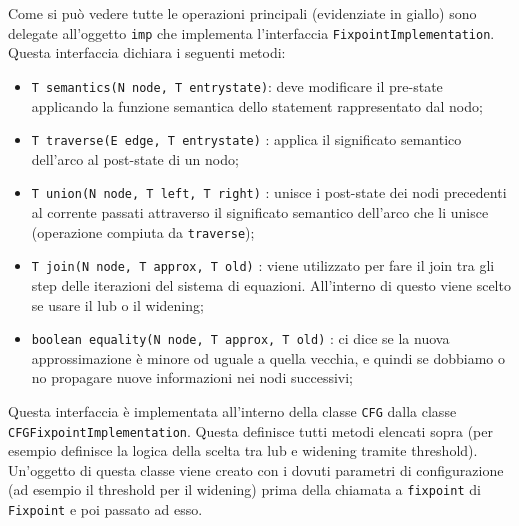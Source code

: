Come si può vedere tutte le operazioni principali (evidenziate in giallo) sono delegate all'oggetto \texttt{imp} che implementa l'interfaccia \texttt{FixpointImplementation}. Questa interfaccia dichiara i seguenti metodi:
\begin{itemize}
\itemsep0pt
    \item \texttt{T semantics(N node, T entrystate)}: deve modificare il pre-state applicando la funzione semantica dello statement rappresentato dal nodo;
	\item \texttt{T traverse(E edge, T entrystate)} : applica il significato semantico dell'arco al post-state di un nodo;
	\item \texttt{T union(N node, T left, T right)} : unisce i post-state dei nodi precedenti al corrente passati attraverso il significato semantico dell'arco che li unisce (operazione compiuta da \texttt{traverse});
	\item \texttt{T join(N node, T approx, T old)} : viene utilizzato per fare il join tra gli step delle iterazioni del sistema di equazioni. All'interno di questo viene scelto se usare il lub o il widening;
	\item \texttt{boolean equality(N node, T approx, T old)} : ci dice se la nuova approssimazione è minore od uguale a quella vecchia, e quindi se dobbiamo o no propagare nuove informazioni nei nodi successivi;
\end{itemize}
Questa interfaccia è implementata all'interno della classe \texttt{CFG} dalla classe \texttt{CFGFixpointImplementation}. Questa definisce tutti metodi elencati sopra (per esempio definisce la logica della scelta tra lub e widening tramite threshold). Un'oggetto di questa classe viene creato con i dovuti parametri di configurazione (ad esempio il threshold per il widening) prima della chiamata a \texttt{fixpoint} di \texttt{Fixpoint} e poi passato ad esso.

